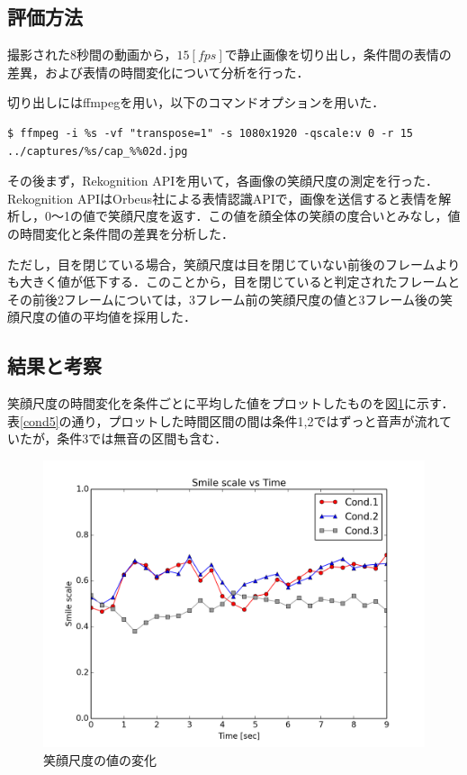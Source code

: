 \documentclass[report,10pt,uplatex,titlepage]{jsarticle}
\begin{document}
\subsection{評価方法}

撮影された8秒間の動画から，$15 [fps]$で静止画像を切り出し，条件間の表情の差異，および表情の時間変化について分析を行った．

切り出しにはffmpegを用い，以下のコマンドオプションを用いた．

\begin{verbatim}
$ ffmpeg -i %s -vf "transpose=1" -s 1080x1920 -qscale:v 0 -r 15 ../captures/%s/cap_%%02d.jpg
\end{verbatim}

その後まず，Rekognition APIを用いて，各画像の笑顔尺度の測定を行った．Rekognition APIはOrbeus社による表情認識APIで，画像を送信すると表情を解析し，0〜1の値で笑顔尺度を返す．この値を顔全体の笑顔の度合いとみなし，値の時間変化と条件間の差異を分析した．

ただし，目を閉じている場合，笑顔尺度は目を閉じていない前後のフレームよりも大きく値が低下する．このことから，目を閉じていると判定されたフレームとその前後2フレームについては，3フレーム前の笑顔尺度の値と3フレーム後の笑顔尺度の値の平均値を採用した．

\subsection{結果と考察}

笑顔尺度の時間変化を条件ごとに平均した値をプロットしたものを図\ref{graph-smooth}に示す．表\ref{cond5}の通り，プロットした時間区間の間は条件1,2ではずっと音声が流れていたが，条件3では無音の区間も含む．

\begin{figure}[h!]
  \centering  
\includegraphics[width=140mm, bb=0 0 600 450]{images/smooth5_avg.png}
\caption{笑顔尺度の値の変化}
  \label{graph-smooth}
\end{figure}
\end{document}
